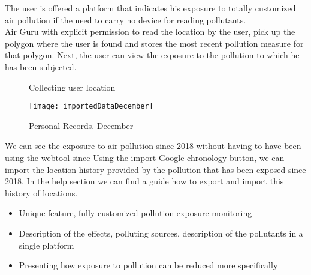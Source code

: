 The user is offered a platform that indicates his exposure to totally customized air pollution if the need to carry
no device for reading pollutants.\\

Air Guru with explicit permission to read the location by the user, pick up the polygon where
the user is found and stores the most recent pollution measure for that polygon. Next, the
user can view the exposure to the pollution to which he has been subjected.

\begin{figure}[ht]
    \centering 
    \caption{Collecting user location}
\end{figure}

\begin{figure}[ht]
    \centering
    \texttt{[image: importedDataDecember]}
    \caption{Personal Records. December}
\end{figure}

We can see the exposure to air pollution since 2018 without having to have been using the webtool since
Using the import Google chronology button, we can import the location history provided by the
pollution that has been exposed since 2018. In the help section we can find a guide how to
export and import this history of locations.

\begin{itemize}
    \item Unique feature, fully customized pollution exposure monitoring
    \item Description of the effects, polluting sources, description of the pollutants in a single platform
    \item Presenting how exposure to pollution can be reduced more specifically
\end{itemize}